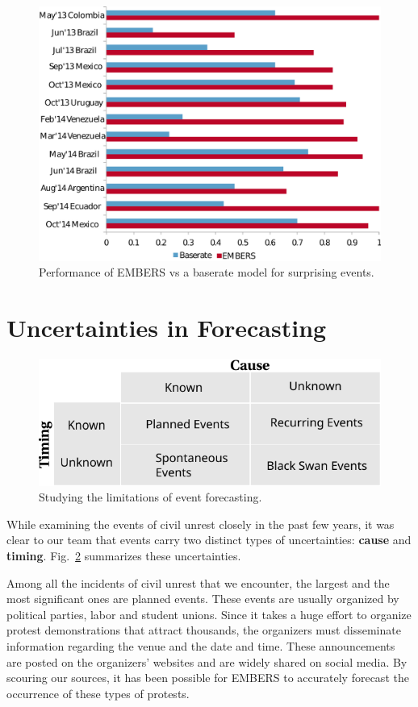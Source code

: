 \documentclass[11pt,a4paper,extrafontsizes,oneside]{article}
\begin{document}
\begin{figure} \centering
\includegraphics[width=.99\columnwidth]{maxent}
\caption{Performance of EMBERS vs a baserate model for surprising events.}
\label{fig:maxent}
\end{figure}

\section{Uncertainties in Forecasting}
\label{limitations}
\begin{figure}
\includegraphics[width=\columnwidth]{event_confusionMatrix}
\caption{Studying the limitations of event forecasting.}
\label{rumsfeld}
\end{figure}

While examining the events of civil unrest closely
in the past few years, it was clear to our
team that events carry two distinct types of uncertainties: {\bf cause}
and {\bf timing}.
Fig.~\ref{rumsfeld} summarizes these uncertainties.

Among all the incidents of civil unrest that we encounter, the largest and the most significant ones
are planned events.  These events are usually organized by political parties, labor and student unions.
Since it takes a huge effort to organize protest demonstrations that
attract thousands, the organizers must disseminate information regarding the venue
and the date and time.  These announcements are posted on the organizers’ websites and
are widely shared on social media.  By scouring our sources,
it has been possible for EMBERS to accurately forecast the occurrence of these types of protests.
\end{document}
